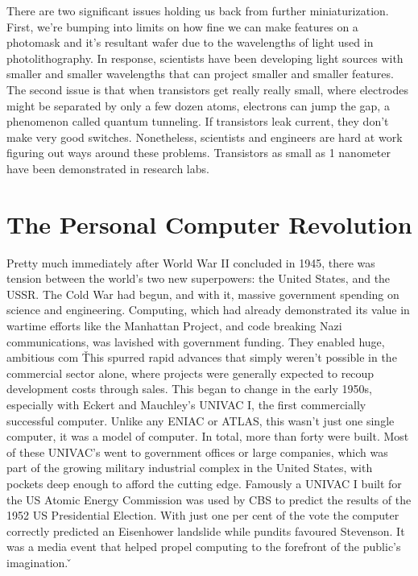 There are two significant issues holding us back from further miniaturization. First, we're bumping into limits on
how fine we can make features on a photomask and it's resultant wafer due to the wavelengths of light used in
photolithography. In response, scientists have been developing light sources with smaller and smaller wavelengths
that can project smaller and smaller features. The second issue is that when transistors get really really small,
where electrodes might be separated by only a few dozen atoms, electrons can jump the gap, a phenomenon called
quantum tunneling. If transistors leak current, they don't make very good switches. Nonetheless, scientists and
engineers are hard at work figuring out ways around these problems. Transistors as small as 1 nanometer have been
demonstrated in research labs.

\section{The Personal Computer Revolution}

Pretty much immediately after World War II concluded in 1945, there was tension between the world's two new
superpowers: the United States, and the USSR. The Cold War had begun, and with it, massive government spending on
science and engineering. Computing, which had already demonstrated its value in wartime efforts like the Manhattan
Project, and code breaking Nazi communications, was lavished with government funding. They enabled huge, ambitious
com \v

This spurred rapid advances that simply weren't possible in the commercial sector alone, where projects were
generally expected to recoup development costs through sales. This began to change in the early 1950s, especially
with Eckert and Mauchley's UNIVAC I, the first commercially successful computer. Unlike any ENIAC or ATLAS, this
wasn't just one single computer, it was a model of computer. In total, more than forty were built. Most of these
UNIVAC's went to government offices or large companies, which was part of the growing military industrial complex in
the United States, with pockets deep enough to afford the cutting edge. Famously a UNIVAC I built for the US Atomic
Energy Commission was used by CBS to predict the results of the 1952 US Presidential Election. With just one per cent
of the vote the computer correctly predicted an Eisenhower landslide while pundits favoured Stevenson. It was a media
event that helped propel computing to the forefront of the public's imagination. \v


